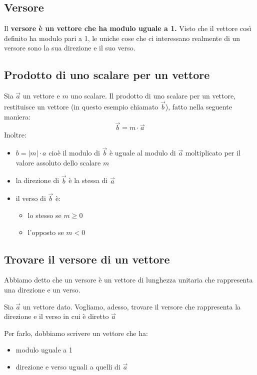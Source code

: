\documentclass[a4paper]{book}
\begin{document}
\subsection{Versore}
Il \textbf{versore è un vettore che ha modulo uguale a 1.} Visto che il vettore così definito ha modulo pari a 1, le uniche cose che ci interessano realmente di un versore sono la sua direzione e il suo verso.

\subsection{Prodotto di uno scalare per un vettore}
Sia $\overrightarrow{a}$ un vettore e $m$ uno scalare. Il prodotto di uno scalare per un vettore, restituisce un vettore (in questo esempio chiamato $\overrightarrow{b}$), fatto nella seguente maniera: $$ \overrightarrow{b} = m \cdot \overrightarrow{a} $$
Inoltre:
\begin{itemize}
	\item $b = \left | m \right | \cdot a $ cioè il modulo di $\overrightarrow{b}$ è uguale al modulo di $\overrightarrow{a}$ moltiplicato per il valore assoluto dello scalare $m$
	\item la direzione di $\overrightarrow{b} $ è la stessa di $\overrightarrow{a}$
	\item il verso di $\overrightarrow{b}$ è:
	\begin{itemize}
		\item lo stesso se $ m \geqslant 0 $
		\item l'opposto se $ m < 0 $
	\end{itemize}
\end{itemize}

\subsection{Trovare il versore di un vettore}
Abbiamo detto che un versore è un vettore di lunghezza unitaria che rappresenta una direzione e un verso.

Sia $ \overrightarrow{a} $ un vettore dato. Vogliamo, adesso, trovare il versore che rappresenta la direzione e il verso in cui è diretto $ \overrightarrow{a} $ 

Per farlo, dobbiamo scrivere un vettore che ha:

\begin{itemize}
	\item modulo uguale a 1
	\item direzione e verso uguali a quelli di $ \overrightarrow{a} $
\end{itemize}
\end{document}
